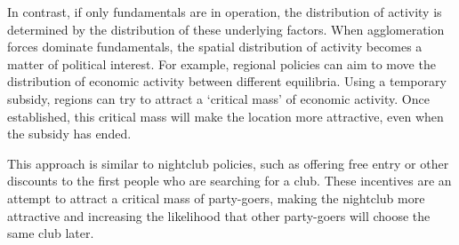 \documentclass[
  12pt,
  oneside]{book}
\theoremstyle{definition}
\theoremstyle{definition}
\theoremstyle{definition}
\theoremstyle{definition}
\theoremstyle{remark}
\begin{document}
In contrast, if only fundamentals are in operation, the distribution of activity is determined by the distribution of these underlying factors. When agglomeration forces dominate fundamentals, the spatial distribution of activity becomes a matter of political interest. For example, regional policies can aim to move the distribution of economic activity between different equilibria. Using a temporary subsidy, regions can try to attract a `critical mass' of economic activity. Once established, this critical mass will make the location more attractive, even when the subsidy has ended.

This approach is similar to nightclub policies, such as offering free entry or other discounts to the first people who are searching for a club. These incentives are an attempt to attract a critical mass of party-goers, making the nightclub more attractive and increasing the likelihood that other party-goers will choose the same club later.
\end{document}
